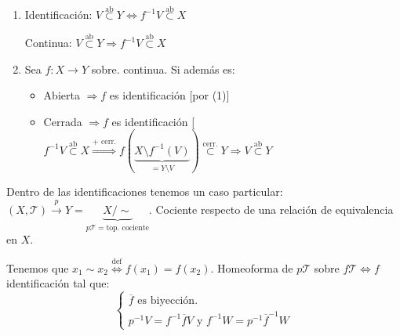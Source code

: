 \begin{obs}
\begin{enumerate}
    \item Identificación: $V \stackrel{\text{ab}}{\subset} Y \Leftrightarrow f^{-1}V \stackrel{\text{ab}}{\subset} X$

    Continua: $V \stackrel{\text{ab}}{\subset } Y \Rightarrow f^{-1}V \stackrel{\text{ab}}{\subset} X$

    \item Sea $f: X \rightarrow Y$ sobre. continua. Si además es:
    \begin{itemize}
        \item Abierta $\Rightarrow f$ es identificación [por (1)]
        \item Cerrada $\Rightarrow f$ es identificación [$f^{-1}V \stackrel{\text{ab}}{\subset} X \stackrel{\text{+ cerr.}}{\Rightarrow} f\left( \underbrace{X \setminus f^{-1}\left( V \right)}_{= Y\setminus V} \right) \stackrel{\text{cerr.}}{\subset} Y \Rightarrow V \stackrel{\text{ab}}{\subset} Y$
    \end{itemize}
\end{enumerate}
\end{obs}

\begin{defi}[Cociente]
Dentro de las identificaciones tenemos un caso particular: $\left( X, \mathcal{T} \right) \stackrel{p}{\rightarrow} Y = \underbrace{X / \sim}_{p \mathcal{T} = \text{top. cociente}}$. Cociente respecto de una relación de equivalencia en $X$. 
\end{defi}

\begin{figure}[H]
    \centering    
\end{figure}
Tenemos que $x_1 \sim x_2 \stackrel{\text{def}}{\Leftrightarrow} f\left( x_1 \right) = f\left( x_2 \right)$. Homeoforma de $p\mathcal{T}$ sobre $f\mathcal{T} \Leftrightarrow f$ identificación tal que:
\[
\begin{cases}
    \overline{f} \text{ es biyección.}\\
    p^{-1}V = f^{-1}\overline{f} V \text{ y } f^{-1}W = p^{-1} \overline{f}^{-1}W
\end{cases} 
\]

